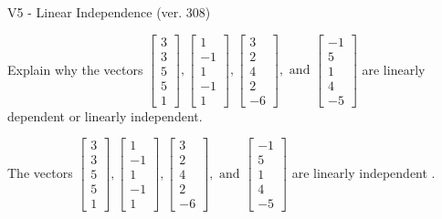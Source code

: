 \begin{exercise}
  \begin{exerciseTitle}V5 - Linear Independence (ver. 308)\end{exerciseTitle}
  \begin{exerciseStatement}
    Explain why the vectors \(\left[\begin{array}{r}
3 \\
3 \\
5 \\
5 \\
1
\end{array}\right] , \left[\begin{array}{r}
1 \\
-1 \\
1 \\
-1 \\
1
\end{array}\right] , \left[\begin{array}{r}
3 \\
2 \\
4 \\
2 \\
-6
\end{array}\right] , \text{ and } \left[\begin{array}{r}
-1 \\
5 \\
1 \\
4 \\
-5
\end{array}\right]\) are linearly dependent or linearly independent.	


  \end{exerciseStatement}
  \begin{exerciseAnswer}
   The vectors \(\left[\begin{array}{r}
3 \\
3 \\
5 \\
5 \\
1
\end{array}\right] , \left[\begin{array}{r}
1 \\
-1 \\
1 \\
-1 \\
1
\end{array}\right] , \left[\begin{array}{r}
3 \\
2 \\
4 \\
2 \\
-6
\end{array}\right] , \text{ and } \left[\begin{array}{r}
-1 \\
5 \\
1 \\
4 \\
-5
\end{array}\right]\) are 
  	 linearly independent  .
  


  \end{exerciseAnswer}
\end{exercise}